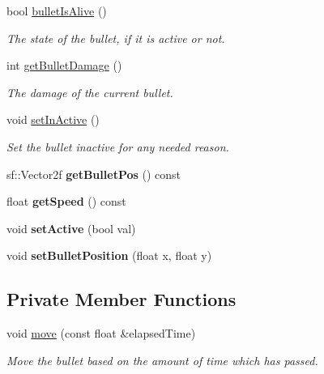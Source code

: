 \begin{DoxyCompactItemize}
bool \hyperlink{class_bullet_a103ff9146dce215f15ca0c4282a5a8cf}{bullet\+Is\+Alive} ()
\begin{DoxyCompactList}\small\item\em The state of the bullet, if it is active or not. \end{DoxyCompactList}\item 
\mbox{\label{class_bullet_a588467f138b5c65d018bf04ab2ca2931}} 
int \hyperlink{class_bullet_a588467f138b5c65d018bf04ab2ca2931}{get\+Bullet\+Damage} ()
\begin{DoxyCompactList}\small\item\em The damage of the current bullet. \end{DoxyCompactList}\item 
\mbox{\label{class_bullet_afe143dafb173b03b6f35fa9472cbe465}} 
void \hyperlink{class_bullet_afe143dafb173b03b6f35fa9472cbe465}{set\+In\+Active} ()
\begin{DoxyCompactList}\small\item\em Set the bullet inactive for any needed reason. \end{DoxyCompactList}\item 
\mbox{\label{class_bullet_a22bc1ccf27f5ff8fe939616ca10b1489}} 
sf\+::\+Vector2f {\bfseries get\+Bullet\+Pos} () const
\item 
\mbox{\label{class_bullet_ac1d1af57b11dae435ca8d951e85b7079}} 
float {\bfseries get\+Speed} () const
\item 
\mbox{\label{class_bullet_adfd1d1a317bd18f9d6aec65630301ae2}} 
void {\bfseries set\+Active} (bool val)
\item 
\mbox{\label{class_bullet_af6e316869e595d8f0b2af44dd80a8dd6}} 
void {\bfseries set\+Bullet\+Position} (float x, float y)
\end{DoxyCompactItemize}
\subsection*{Private Member Functions}
\begin{DoxyCompactItemize}
\item 
void \hyperlink{class_bullet_a1ea29046b26f40abb9f94ca2ccd5d215}{move} (const float \&elapsed\+Time)
\begin{DoxyCompactList}\small\item\em Move the bullet based on the amount of time which has passed. \end{DoxyCompactList}\end{DoxyCompactItemize}
